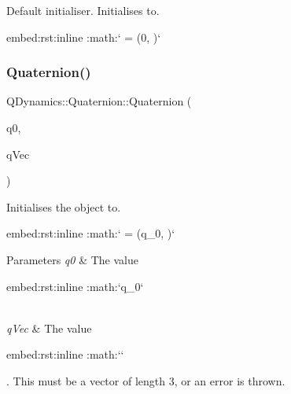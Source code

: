Default initialiser. Initialises to. 

\begin{DoxyVerb}embed:rst:inline :math:` = (0, )` \end{DoxyVerb}
 \mbox{\label{classQDynamics_1_1Quaternion_a206147a6dbe4a9456cd655d654ef0182}} 
\subsubsection{\texorpdfstring{Quaternion()}{Quaternion()}\hspace{0.1cm}{\footnotesize\ttfamily [2/5]}}
{\footnotesize\ttfamily Q\+Dynamics\+::\+Quaternion\+::\+Quaternion (\begin{DoxyParamCaption}\item[{const double \&}]{q0,  }\item[{const \hyperlink{classJSL_1_1Vector}{J\+S\+L\+::\+Vector} \&}]{q\+Vec }\end{DoxyParamCaption})\hspace{0.3cm}{\ttfamily [inline]}}



Initialises the object to. 

\begin{DoxyVerb}embed:rst:inline :math:` = (q_0, )` \end{DoxyVerb}
 
\begin{DoxyParams}{Parameters}
{\em q0} & The value\begin{DoxyVerb}embed:rst:inline :math:`q_0` \end{DoxyVerb}
 \\
\hline
{\em q\+Vec} & The value\begin{DoxyVerb}embed:rst:inline :math:`` \end{DoxyVerb}
. This must be a vector of length 3, or an error is thrown. \\
\hline
\end{DoxyParams}
\mbox{\label{classQDynamics_1_1Quaternion_aadf267f7d62df09bf09b04cc47704560}} 
